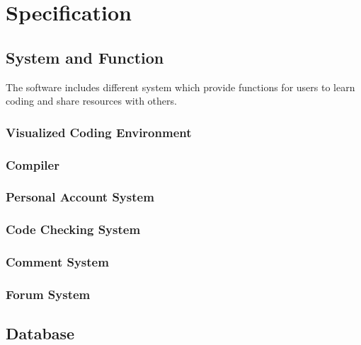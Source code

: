 \chapter{Specification}
\section{System and Function}
The software includes different system which provide functions for users to learn coding and share resources with others.
\subsection{Visualized Coding Environment}
	
\subsection{Compiler}
\subsection{Personal Account System}
	
\subsection{Code Checking System}
	
\subsection{Comment System}
	
\subsection{Forum System}
	
\section{Database}
